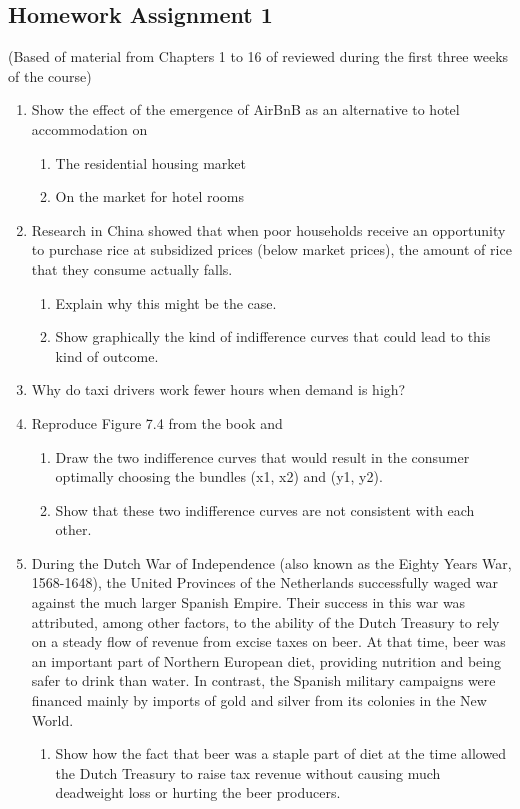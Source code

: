 \documentclass{article}
\begin{document}
\subsection*{Homework Assignment 1}
(Based of material from Chapters 1 to 16 of \textcite{Valrian_Inter_Micro} reviewed during the first three weeks of the course)
\begin{enumerate}
  \item Show the effect of the emergence of AirBnB as an alternative to hotel accommodation on
  \begin{enumerate}
    \item The residential housing market
    \item On the market for hotel rooms
  \end{enumerate}
  \item Research in China showed that when poor households receive an opportunity to purchase rice at subsidized prices (below market prices), the amount of rice that they consume actually falls.
  \begin{enumerate}
    \item Explain why this might be the case.
    \item Show graphically the kind of indifference curves that could lead to this kind of outcome.
  \end{enumerate}
  \item Why do taxi drivers work fewer hours when demand is high?
  \item Reproduce Figure 7.4 from the book and
  \begin{enumerate}
    \item Draw the two indifference curves that would result in the consumer optimally choosing the bundles (x1, x2) and (y1, y2).
    \item Show that these two indifference curves are not consistent with each other.
    \end{enumerate}
  \item During the Dutch War of Independence (also known as the Eighty Years War, 1568-1648), the United Provinces of the Netherlands successfully waged war against the much larger Spanish Empire. Their success in this war was attributed, among other factors, to the ability of the Dutch Treasury to rely on a steady flow of revenue from excise taxes on beer. At that time, beer was an important part of Northern European diet, providing nutrition and being safer to drink than water. In contrast, the Spanish military campaigns were financed mainly by imports of gold and silver from its colonies in the New World.
  \begin{enumerate}
    \item Show how the fact that beer was a staple part of diet at the time allowed the Dutch Treasury to raise tax revenue without causing much deadweight loss or hurting the beer producers.
  \end{enumerate}

\end{enumerate}
\newpage
\end{document}
